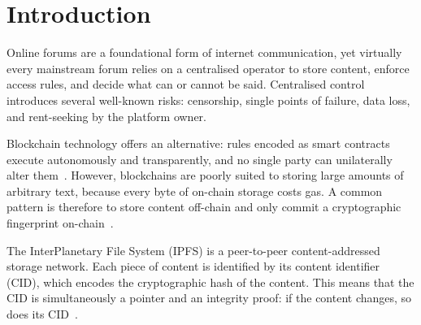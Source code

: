 \documentclass[11pt]{article}
\begin{document}
\begin{abstract}
This report presents the design, implementation, and evaluation of a decentralised forum application built on the UZHETH Proof-of-Stake blockchain (chainId~70207). The system enables users to create posts and nested comments, and to like content, without relying on any centralised server for either data storage or access control. Post and comment content is stored on the InterPlanetary File System (IPFS) as DAG-JSON blocks; only the 32-byte SHA-256 content digest is written on-chain, keeping gas costs minimal while guaranteeing content integrity. The Ethereum smart contract is written in Solidity~0.8.28, the frontend in Angular~20 with Ionic~8, and MetaMask is used for wallet integration via ethers.js~v6. The report describes the architecture, smart-contract design, IPFS integration, frontend implementation, and testing methodology, and concludes with a discussion of current limitations and possible future work.
\end{abstract}

\newpage

\section{Introduction}

Online forums are a foundational form of internet communication, yet virtually every mainstream forum relies on a centralised operator to store content, enforce access rules, and decide what can or cannot be said. Centralised control introduces several well-known risks: censorship, single points of failure, data loss, and rent-seeking by the platform owner.

Blockchain technology offers an alternative: rules encoded as smart contracts execute autonomously and transparently, and no single party can unilaterally alter them~\cite{buterin2014ethereum}. However, blockchains are poorly suited to storing large amounts of arbitrary text, because every byte of on-chain storage costs gas. A common pattern is therefore to store content off-chain and only commit a cryptographic fingerprint on-chain~\cite{benet2014ipfs}.

The InterPlanetary File System (IPFS) is a peer-to-peer content-addressed storage network. Each piece of content is identified by its content identifier (CID), which encodes the cryptographic hash of the content. This means that the CID is simultaneously a pointer and an integrity proof: if the content changes, so does its CID~\cite{benet2014ipfs}.
\end{document}
